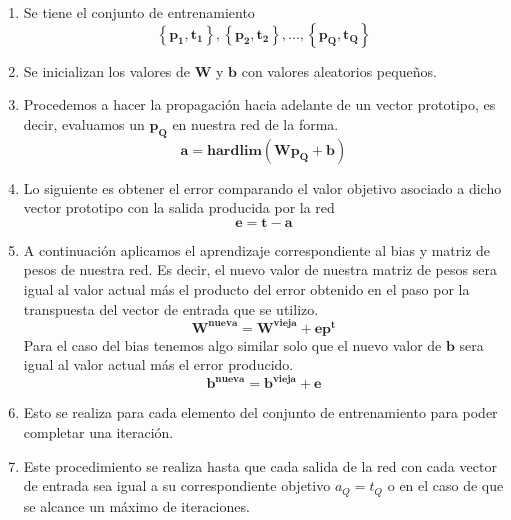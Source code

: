 \documentclass[12pt, titlepage]{article}
\begin{document}
        \begin{enumerate}
            \item Se tiene el conjunto de entrenamiento
            \[ \left\lbrace \boldsymbol{p_1, t_1}\right\rbrace , \left\lbrace \boldsymbol{p_2, t_2}\right\rbrace , ... , \left\lbrace \boldsymbol{p_Q, t_Q}\right\rbrace\]
            \item Se inicializan los valores de $\boldsymbol{W}$ y $\boldsymbol{b}$ con valores aleatorios pequeños.
            \item Procedemos a hacer la propagación hacia adelante de un vector prototipo, es decir, evaluamos un $\boldsymbol{p_Q}$ en nuestra red de la forma.
            \[ \boldsymbol{a = hardlim(Wp_Q+b)} \]
            \item Lo siguiente es obtener el error comparando el valor objetivo asociado a dicho vector prototipo con la salida producida por la red
            \[ \boldsymbol{e=t-a} \]
            \item A continuación aplicamos el aprendizaje correspondiente al bias y matriz de pesos de nuestra red. Es decir, el nuevo valor de nuestra matriz de pesos sera igual al valor actual más el producto del error obtenido en el paso por la transpuesta del vector de entrada que se utilizo.
            \[ \boldsymbol{W^{nueva} = W^{vieja} + ep^{t}} \]
            Para el caso del bias tenemos algo similar solo que el nuevo valor de $\boldsymbol{b}$ sera igual al valor actual más el error producido.
            \[ \boldsymbol{b^{nueva} = b^{vieja} + e} \]
            \item Esto se realiza para cada elemento del conjunto de entrenamiento para poder completar una iteración.
            \item Este procedimiento se realiza hasta que cada salida de la red con cada vector de entrada sea igual a su correspondiente objetivo $a_Q = t_Q$ o en el caso de que se alcance un máximo de iteraciones.
        \end{enumerate}
        \newpage
\end{document}
